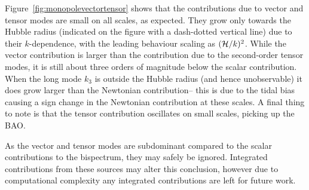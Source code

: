 Figure~\ref{fig:monopolevectortensor} shows that the contributions due to vector and tensor modes are small on all scales, as expected. They grow only towards the Hubble radius (indicated on the figure with a dash-dotted vertical line) due to their $k$-dependence, with the leading behaviour scaling as $(\mathcal{H}/k)^2$. While the vector contribution is larger than the contribution due to the second-order tensor modes, it is still about three orders of magnitude below the scalar contribution. When the long mode $k_3$ is outside the Hubble radius (and hence unobservable) it does grow larger than the Newtonian contribution-- this is due to the tidal bias causing a sign change in the Newtonian contribution at these scales. A final thing to note is that the tensor contribution oscillates on small scales, picking up the BAO. 

As the vector and tensor modes are subdominant compared to the scalar contributions to the bispectrum, they may safely be ignored. Integrated contributions from these sources may alter this conclusion, however due to computational complexity any integrated contributions are left for future work. 



